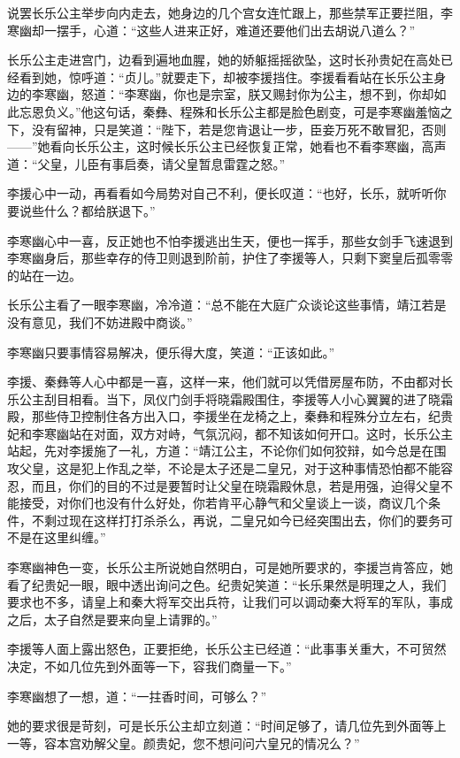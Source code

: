 说罢长乐公主举步向内走去，她身边的几个宫女连忙跟上，那些禁军正要拦阻，李寒幽却一摆手，心道：“这些人进来正好，难道还要他们出去胡说八道么？”

长乐公主走进宫门，边看到遍地血腥，她的娇躯摇摇欲坠，这时长孙贵妃在高处已经看到她，惊呼道：“贞儿。”就要走下，却被李援挡住。李援看看站在长乐公主身边的李寒幽，怒道：“李寒幽，你也是宗室，朕又赐封你为公主，想不到，你却如此忘恩负义。”他这句话，秦彝、程殊和长乐公主都是脸色剧变，可是李寒幽羞恼之下，没有留神，只是笑道：“陛下，若是您肯退让一步，臣妾万死不敢冒犯，否则——”她看向长乐公主，这时候长乐公主已经恢复正常，她看也不看李寒幽，高声道：“父皇，儿臣有事启奏，请父皇暂息雷霆之怒。”

李援心中一动，再看看如今局势对自己不利，便长叹道：“也好，长乐，就听听你要说些什么？都给朕退下。”

李寒幽心中一喜，反正她也不怕李援逃出生天，便也一挥手，那些女剑手飞速退到李寒幽身后，那些幸存的侍卫则退到阶前，护住了李援等人，只剩下窦皇后孤零零的站在一边。

长乐公主看了一眼李寒幽，冷冷道：“总不能在大庭广众谈论这些事情，靖江若是没有意见，我们不妨进殿中商谈。”

李寒幽只要事情容易解决，便乐得大度，笑道：“正该如此。”

李援、秦彝等人心中都是一喜，这样一来，他们就可以凭借房屋布防，不由都对长乐公主刮目相看。当下，凤仪门剑手将晓霜殿围住，李援等人小心翼翼的进了晓霜殿，那些侍卫控制住各方出入口，李援坐在龙椅之上，秦彝和程殊分立左右，纪贵妃和李寒幽站在对面，双方对峙，气氛沉闷，都不知该如何开口。这时，长乐公主站起，先对李援施了一礼，方道：“靖江公主，不论你们如何狡辩，如今总是在围攻父皇，这是犯上作乱之举，不论是太子还是二皇兄，对于这种事情恐怕都不能容忍，而且，你们的目的不过是要暂时让父皇在晓霜殿休息，若是用强，迫得父皇不能接受，对你们也没有什么好处，你若肯平心静气和父皇谈上一谈，商议几个条件，不剩过现在这样打打杀杀么，再说，二皇兄如今已经突围出去，你们的要务可不是在这里纠缠。”

李寒幽神色一变，长乐公主所说她自然明白，可是她所要求的，李援岂肯答应，她看了纪贵妃一眼，眼中透出询问之色。纪贵妃笑道：“长乐果然是明理之人，我们要求也不多，请皇上和秦大将军交出兵符，让我们可以调动秦大将军的军队，事成之后，太子自然是要来向皇上请罪的。”

李援等人面上露出怒色，正要拒绝，长乐公主已经道：“此事事关重大，不可贸然决定，不如几位先到外面等一下，容我们商量一下。”

李寒幽想了一想，道：“一拄香时间，可够么？”

她的要求很是苛刻，可是长乐公主却立刻道：“时间足够了，请几位先到外面等上一等，容本宫劝解父皇。颜贵妃，您不想问问六皇兄的情况么？”

